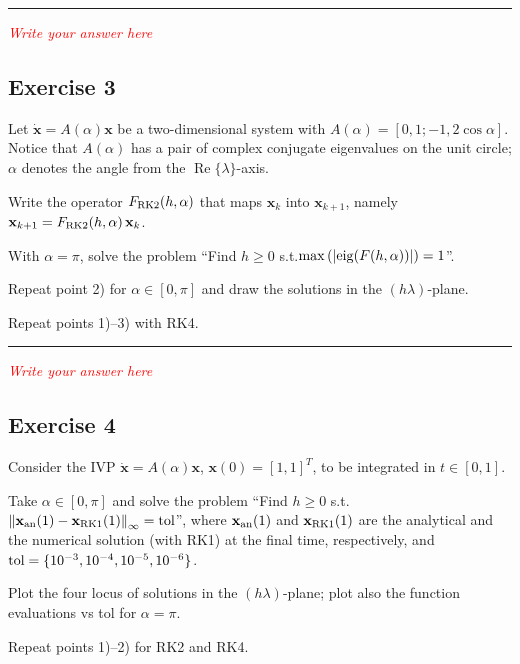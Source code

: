 \documentclass[11pt,a4paper,oneside]{article}
\renewcommand{\vec}[1]{\mathbf{#1}}
\newcommand{\tr}{\textcolor{red}}
\begin{document}
\medskip \hrule \medskip

\tr{\textit{Write your answer here}}

\subsection*{Exercise 3}

Let $\dot{\vec x} = A(\alpha) \vec x$ be a two-dimensional system with $A(\alpha) = [0, 1; -1, 2\cos\alpha]$. Notice that $A(\alpha)$ has a pair of complex conjugate eigenvalues on the unit circle; $\alpha$ denotes the angle from the $\operatorname{Re}\{\lambda\}$-axis. 
\begin{enumerate*}[label=\arabic*)]
    \item Write the operator $F_{\rm RK2}(h,\alpha)$ that maps $\vec x_k$ into $\vec x_{k+1}$, namely $\vec x_{k+1} = F_{\rm RK2}(h,\alpha) \, \vec x_k$.
    \item\!With $\alpha = \pi$, solve the problem ``Find $h\ge 0$ s.t.$\max\left(|{\rm eig}(F(h,\alpha))|\right) = 1$''.
    \item Repeat point 2) for $\alpha\in[0, \pi]$ and draw the solutions in the $(h\lambda)$-plane.
    \item Repeat points 1)--3) with RK4.
\end{enumerate*}

\medskip \hrule \medskip

\tr{\textit{Write your answer here}}


\subsection*{Exercise 4}

Consider the IVP $\dot{\vec x}=A(\alpha)\vec x$, $\vec x(0) = [1, 1]^T$, to be integrated in $t\in[0, 1]$.
\begin{enumerate*}[label=\arabic*)]
    \item Take $\alpha\in[0, \pi]$ and solve the problem ``Find $h\ge 0$ s.t. $\left\|\vec x_{\rm an}(1)-\vec x_{\rm RK1}(1)\right\|_\infty = \mathrm{tol}$'', where $\vec x_{\rm an}(1)$ and $\vec x_{\rm RK1}(1)$ are the analytical and the numerical solution (with RK1) at the final time, respectively, and $\rm tol = \{10^{-3}, 10^{-4}, 10^{-5}, 10^{-6}\}$.
    \item Plot the four locus of solutions in the $(h\lambda)$-plane; plot also the function evaluations vs tol for $\alpha= \pi$.
    \item Repeat points 1)--2) for RK2 and RK4.
\end{enumerate*}
\end{document}
